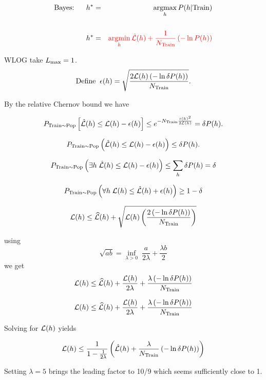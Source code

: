 {\vfill
\begin{eqnarray*}
\mbox{Bayes:}\;\;\;\;\;\;h^* & = & \operatorname*{argmax}_h P(h|\mathrm{Train}) \\
\\
h^* & = & {\color{red} \operatorname*{argmin}_h \hat{\cal L}(h) + \frac{1}{N_\mathrm{Train}}\left(- \ln P(h)\right)}
\end{eqnarray*}


WLOG take $L_{\max} = 1$.
$$\mathrm{Define}\;\;\epsilon(h) = \sqrt{\frac{2{\cal L}(h)\left(-\ln \delta P(h)\right)}{N_\mathrm{Train}}}.$$

\vfill
By the relative Chernov bound we have

\vfill
$$P_{\mathrm{Train} \sim \mathrm{Pop}}\left[\hat{{\cal L}}(h) \leq {\cal L}(h) - \epsilon(h)\right] \leq e^{-N_\mathrm{Train}\frac{\epsilon(h)^2}{2{\cal L}(h)}} = \delta P(h).$$


$$P_{\mathrm{Train} \sim \mathrm{Pop}}\left(\hat{{\cal L}}(h) \leq {\cal L}(h) - \epsilon(h)\right) \leq \delta P(h).$$

\vfill
$$P_{\mathrm{Train} \sim \mathrm{Pop}}\left(\exists h\;\hat{{\cal L}}(h) \leq {\cal L}(h) - \epsilon(h)\right) \leq \sum_h \delta P(h) =\delta$$

\vfill
$$P_{\mathrm{Train} \sim \mathrm{Pop}}\left(\forall h\;{\cal L}(h) \leq \hat{{\cal L}}(h) + \epsilon(h)\right) \geq 1- \delta$$


$${\cal L}(h) \leq \widehat{{\cal L}}(h) + \sqrt{{\cal L}(h)\left(\frac{2 \left(- \ln \delta P(h)\right)}{N_\mathrm{Train}}\right)}$$

using
$$\sqrt{ab} = \inf_{\lambda > 0}\;\frac{a}{2\lambda} + \frac{\lambda b}{2}$$
\vfill
we get
$${\cal L}(h) \leq \widehat{{\cal L}}(h) + \frac{{\cal L}(h)}{2\lambda} + \frac{\lambda\left(- \ln \delta P(h)\right)}{N_\mathrm{Train}}$$

$${\cal L}(h) \leq \widehat{{\cal L}}(h) + \frac{{\cal L}(h)}{2\lambda} + \frac{\lambda\left(-\ln \delta P(h)\right)}{N_\mathrm{Train}}$$

\vfill
Solving for ${\cal L}(h)$ yields

\vfill
$${\cal L}(h) \leq \frac{1}{1-\frac{1}{2\lambda}}\left(\hat{{\cal L}}(h) + \frac{\lambda}{N_\mathrm{Train}}\left(-\ln\delta P(h)\right)\right)$$

\vfill
Setting $\lambda = 5$ brings the leading factor to 10/9 which seems sufficiently close to 1.

}
